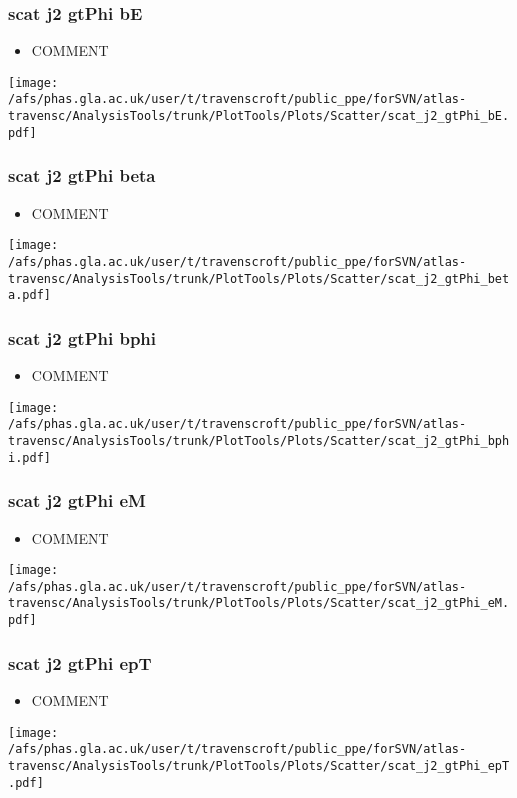 \documentclass{beamer}
\begin{document}
\begin{frame}
\frametitle{scat j2 gtPhi bE}
\begin{itemize}
\item COMMENT
\end{itemize}
\begin{center}
\texttt{[image: /afs/phas.gla.ac.uk/user/t/travenscroft/public\_ppe/forSVN/atlas-travensc/AnalysisTools/trunk/PlotTools/Plots/Scatter/scat\_j2\_gtPhi\_bE.pdf]}
\end{center}
\end{frame}

\begin{frame}
\frametitle{scat j2 gtPhi beta}
\begin{itemize}
\item COMMENT
\end{itemize}
\begin{center}
\texttt{[image: /afs/phas.gla.ac.uk/user/t/travenscroft/public\_ppe/forSVN/atlas-travensc/AnalysisTools/trunk/PlotTools/Plots/Scatter/scat\_j2\_gtPhi\_beta.pdf]}
\end{center}
\end{frame}

\begin{frame}
\frametitle{scat j2 gtPhi bphi}
\begin{itemize}
\item COMMENT
\end{itemize}
\begin{center}
\texttt{[image: /afs/phas.gla.ac.uk/user/t/travenscroft/public\_ppe/forSVN/atlas-travensc/AnalysisTools/trunk/PlotTools/Plots/Scatter/scat\_j2\_gtPhi\_bphi.pdf]}
\end{center}
\end{frame}

\begin{frame}
\frametitle{scat j2 gtPhi eM}
\begin{itemize}
\item COMMENT
\end{itemize}
\begin{center}
\texttt{[image: /afs/phas.gla.ac.uk/user/t/travenscroft/public\_ppe/forSVN/atlas-travensc/AnalysisTools/trunk/PlotTools/Plots/Scatter/scat\_j2\_gtPhi\_eM.pdf]}
\end{center}
\end{frame}

\begin{frame}
\frametitle{scat j2 gtPhi epT}
\begin{itemize}
\item COMMENT
\end{itemize}
\begin{center}
\texttt{[image: /afs/phas.gla.ac.uk/user/t/travenscroft/public\_ppe/forSVN/atlas-travensc/AnalysisTools/trunk/PlotTools/Plots/Scatter/scat\_j2\_gtPhi\_epT.pdf]}
\end{center}
\end{frame}
\end{document}
